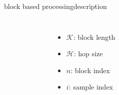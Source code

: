         \begin{frame}{block based processing}{description}
            \vspace{-4mm}

            \begin{columns}
                    \vspace{-11mm}
                    \begin{figure}
                        \centering
                        	
                    \end{figure}
                    \vspace{-3mm}
                    \begin{itemize}
                        \item   $\mathcal{K}$: block length
                        \item   $\mathcal{H}$: hop size
                        \item   $n$: block index
                        \item   $i$: sample index
                    \end{itemize}
           \end{columns}
        \end{frame}
        
